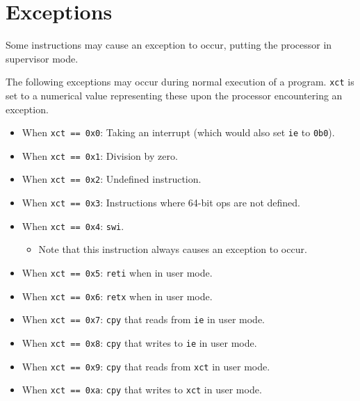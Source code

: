 \documentclass{article}
\begin{document}
\section{Exceptions}
	Some instructions may cause an exception to occur, putting the
	processor in supervisor mode.

	The following exceptions may occur during normal execution of a
	program. \texttt{xct} is set to a numerical value representing these
	upon the processor encountering an exception. 

	\begin{itemize}
	\item When \texttt{xct == 0x0}:
		Taking an interrupt (which would also set \texttt{ie} to
		\texttt{0b0}).
	\item When \texttt{xct == 0x1}: Division by zero.
	\item When \texttt{xct == 0x2}: Undefined instruction.
	\item When \texttt{xct == 0x3}:
		Instructions where 64-bit ops are not defined.
	\item When \texttt{xct == 0x4}: \texttt{swi}.
		\begin{itemize}
		\item Note that this instruction always causes an exception to
			occur.
		\end{itemize}
	\item When \texttt{xct == 0x5}: \texttt{reti} when in user mode.
	\item When \texttt{xct == 0x6}: \texttt{retx} when in user mode.

	\item When \texttt{xct == 0x7}:
		\texttt{cpy} that reads from \texttt{ie} in user mode.
	\item When \texttt{xct == 0x8}:
		\texttt{cpy} that writes to \texttt{ie} in user mode.
	\item When \texttt{xct == 0x9}:
		\texttt{cpy} that reads from \texttt{xct} in user mode.
	\item When \texttt{xct == 0xa}:
		\texttt{cpy} that writes to \texttt{xct} in user mode.



\end{itemize}
\end{document}
